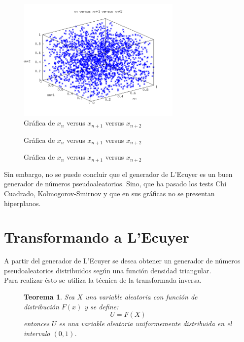 \documentclass{sig-alternate}
\newtheorem{theorem}{Teorema}
\begin{document}

\begin{figure}[ht]
\label{fig:ecuyer_3D_1}
\includegraphics[width=8cm]{ecuyer3D_1}
\caption{Gr\'afica de $x_{n}$ versus $x_{n+1}$ versus $x_{n+2}$}
\end{figure}

\begin{figure}[ht]
\label{fig:ecuyer_3D_2}
\caption{Gr\'afica de $x_{n}$ versus $x_{n+1}$ versus $x_{n+2}$}
\end{figure}

\begin{figure}[ht]
\label{fig:ecuyer_3D_3}
\caption{Gr\'afica de $x_{n}$ versus $x_{n+1}$ versus $x_{n+2}$}
\end{figure}

Sin embargo, no se puede concluir que el generador de L'Ecuyer es un buen generador de n\'umeros
pseudoaleatorios. Sino, que ha pasado los tests Chi Cuadrado, Kolmogorov-Smirnov y que en sus
gr\'aficas no se presentan hiperplanos.

\section{Transformando a L'Ecuyer}
\label{sec:triangle}

A partir del generador de L'Ecuyer se desea obtener un generador de n\'umeros
pseudoaleatorios distribuidos seg\'un una funci\'on densidad triangular.\\
Para realizar \'esto se utiliza la t\'ecnica de la transformada inversa.

\begin{figure}[ht]
\begin{theorem}
\label{theo:1}
Sea $X$ una variable aleatoria con funci\'on de distribuci\'on $F(x)$
y se define:
$$U=F(X)$$
entonces $U$ es una variable aleatoria uniformemente distribuida en el intervalo $(0,1)$.
\end{theorem}
\end{figure}
\end{document}
